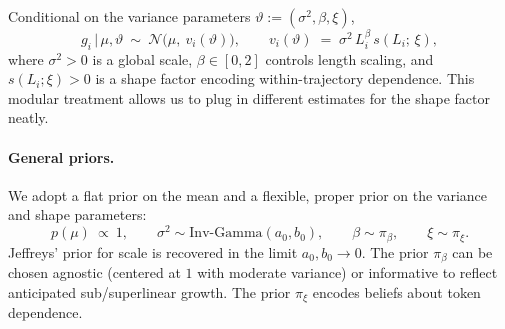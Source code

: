 Conditional on the variance parameters $\vartheta := (\sigma^2, \beta, \xi)$,
\begin{equation}
  g_i \,\big|\, \mu,\vartheta \ \sim\ \mathcal{N}\!\big(\mu,\ v_i(\vartheta)\big),
  \qquad
  v_i(\vartheta)\;=\;\sigma^2\,L_i^{\beta}\,s(L_i;\,\xi),
  \label{eq:hetero_general_prior}
\end{equation}
where $\sigma^2>0$ is a global scale, $\beta\in[0,2]$ controls length scaling, and $s(L_i;\xi)>0$ is a shape factor encoding within-trajectory dependence. This modular treatment allows us to plug in different estimates for the shape factor neatly.

\paragraph{General priors.}
We adopt a flat prior on the mean and a flexible, proper prior on the variance and shape parameters:
\begin{equation}
  p(\mu)\ \propto\ 1,\qquad
  \sigma^2 \sim \mathrm{Inv\text{-}Gamma}(a_0,b_0),\qquad
  \beta \sim \pi_\beta,\qquad
  \xi \sim \pi_\xi.
  \label{eq:priors_general}
\end{equation}
Jeffreys' prior for scale is recovered in the limit $a_0,b_0\to 0$. The prior $\pi_\beta$ can be chosen agnostic (centered at $1$ with moderate variance) or informative to reflect anticipated sub/superlinear growth. The prior $\pi_\xi$ encodes beliefs about token dependence.

